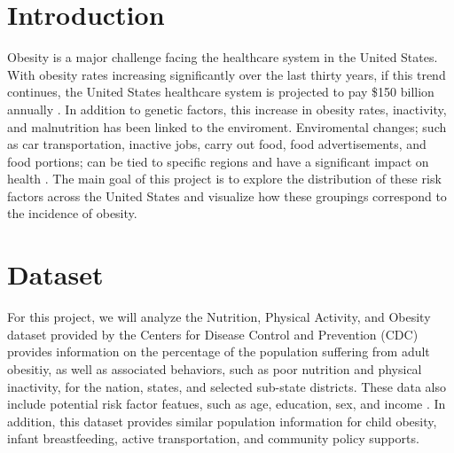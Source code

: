 \documentclass{article}
\begin{document}
 



\section{Introduction}
\label{introduction}

Obesity is a major challenge facing the healthcare system in the United States. With obesity rates increasing significantly over the last thirty years, if this trend continues, the United States healthcare system is projected to pay \$150 billion annually \cite{hurt2010obesity}.
In addition to genetic factors, this increase in obesity rates, inactivity, and malnutrition has been linked to the enviroment. 
Enviromental changes; such as car transportation, inactive jobs, carry out food, food advertisements, and food portions; can be tied to specific regions and have a significant impact on health \cite{whyobesityhealthproblem, understandingadultoverweight}. 
The main goal of this project is to explore the distribution of these risk factors across the United States and visualize how these groupings correspond to the incidence of obesity.

\section{Dataset}
\label{dataset}

For this project, we will analyze the Nutrition, Physical Activity, and Obesity dataset provided by the Centers for Disease Control and Prevention (CDC) provides information on the percentage of the population suffering from adult obesitiy, as well as associated behaviors, such as poor nutrition and physical inactivity, for the nation, states, and selected sub-state districts. These data also include potential risk factor featues, such as age, education, sex, and income \cite{nutphysactobesitydata}.
In addition, this dataset provides similar population information for child obesity, infant breastfeeding, active transportation, and community policy supports.
\end{document}
